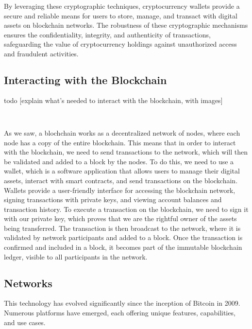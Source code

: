 By leveraging these cryptographic techniques, cryptocurrency wallets provide a secure and reliable means for users to store, manage, and transact with digital assets on blockchain networks. The robustness of these cryptographic mechanisms ensures the confidentiality, integrity, and authenticity of transactions, safeguarding the value of cryptocurrency holdings against unauthorized access and fraudulent activities.

\subsection{Interacting with the Blockchain}

todo [explain what's needed to interact with the blockchain, with images]

~

As we saw, a blochchain works as a decentralized network of nodes, where each node has a copy of the entire blockchain. This means that in order to interact with the blockchain, we need to send transactions to the network, which will then be validated and added to a block by the nodes. To do this, we need to use a wallet, which is a software application that allows users to manage their digital assets, interact with smart contracts, and send transactions on the blockchain.
Wallets provide a user-friendly interface for accessing the blockchain network, signing transactions with private keys, and viewing account balances and transaction history. To execute a transaction on the blockchain, we need to sign it with our private key, which proves that we are the rightful owner of the assets being transferred. The transaction is then broadcast to the network, where it is validated by network participants and added to a block. Once the transaction is confirmed and included in a block, it becomes part of the immutable blockchain ledger, visible to all participants in the network.



\subsection{Networks}

This technology has evolved significantly since the inception of Bitcoin in 2009. Numerous platforms have emerged, each offering unique features, capabilities, and use cases.

~

